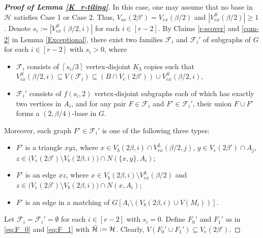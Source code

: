 \documentclass[11pt, a4paper]{article}
\theoremstyle{definition}
\newcommand{\<}{\subseteq}
\begin{document}
\begin{proof}[\bf Proof of Lemma \ref{K_r-tiling}]
In this case, one may assume that no base in  $\mathcal{H}$ satisfies Case 1 or Case 2. Thus, $V_{ne}(2\beta')=V_{ex}(\beta/2)$ and $|V_{ex}^S(\beta/2)|\geq 1$. Denote $s_i:=|V_{ex}^S(\beta/2,i)|$ for each $i\in [r-2]$. By Claims \ref{r-scover} and \ref{com-2} in  Lemma \ref{Exceptional}, there exist two families $\mathcal{F}_i$ and $\mathcal{F}_i'$ of subgraphs of $G$ for each $i\in [r-2]$ with $s_i>0$, where 
\begin{itemize}
    \item $\mathcal{F}_i$ consists of $\left\lceil s_i/3\right\rceil$ vertex-disjoint $K_3$ copies such that $V_{ex}^S(\beta/2,i) \subseteq V(\mathcal{F}_i)\subseteq \left(B\cap V_{e}(2\beta')\right)\cup V_{ex}^S(\beta/2,i)$,
    \item $\mathcal{F}_i'$ consists of $f(s_i,2)$ vertex-disjoint subgraphs each of which has exactly two vertices in $A_i$, and for any pair  $F\in \mathcal{F}_i$ and 
        $F'\in \mathcal{F}_i'$, their union $F\cup F'$ forms a $(2,\beta/4)$-base in $G$. 
\end{itemize}
Moreover, each graph $F'\in \mathcal{F}_i'$ is one of the following three types:
\begin{itemize}
    \item $F'$ is a triangle $xyz$, where $x\in V_b(2\beta,i)\cap V_{ex}^L(\beta/2,j)$, $y\in V_{e}(2\beta')\cap A_j$, $z\in \big(V_{e}(2\beta')\setminus V_b(2\beta,i)\big)\cap N(\{x,y\},  A_i)$;
    \item $F'$ is an edge $xz$, where $x\in V_b(2\beta,i)\setminus V_{ex}^L(\beta/2)$ and $z\in \big(V_{e}(2\beta')\setminus V_b(2\beta,i)\big)\cap N(x,  A_i)$;
    \item $F'$ is an edge in a matching of $G[A_i\setminus (V_b(2\beta,i)\cup V(M_i))]$. 
\end{itemize}
Let $\mathcal{F}_i=\mathcal{F}_i'=\emptyset$ for each  $i\in [r-2]$ with $s_i=0$. 
Define $F_0'$ and $F_1'$ as in \eqref{eq:F_0} and \eqref{eq:F_1} with $\Tilde{\mathcal{H}} := \mathcal{H}$. %
Clearly, $V(F_0'\cup F_1')\subseteq V_e(2\beta')$. %


\end{proof}
\end{document}
